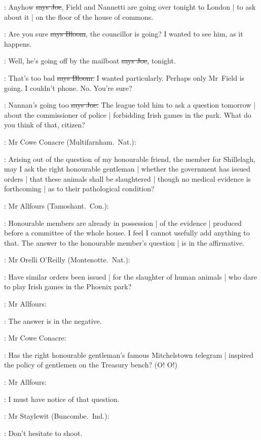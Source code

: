 \joe:
Anyhow
\sout{says Joe},
Field and Nannetti are going over tonight to London
 |
to ask about it |
on the floor of the house of commons.

\Bloom:
Are you sure
\sout{says Bloom},
the councillor is going?
I wanted to see him,
as it happens.

\joe:
Well,
he's going off by the mailboat
\sout{says Joe},
tonight.

\Bloom:
That's too bad
\sout{says Bloom.}
I wanted particularly.
Perhaps only Mr~Field is going.
I couldn't phone.
No.
You're sure?

\joe:
Nannan's going too
\sout{says Joe.}
The league told him to ask a question tomorrow |
about the commissioner of police |
forbidding Irish games in the park.
What do you think of that,
citizen?

:
Mr Cowe Conacre
(Multifarnham.~Nat.):

\conacre:
Arising out of the question of my honourable friend,
the member for Shillelagh,
may I ask the right honourable gentleman |
whether the government has issued orders |
that these animals shall be slaughtered |
though no medical evidence is forthcoming |
as to their pathological condition?

:
Mr Allfours
(Tamoshant.~Con.):

\allfours:
Honourable members are already in possession |
of the evidence |
produced before a committee of the whole house.
I feel I cannot usefully add anything to that.
The answer to the honourable member's question |
is in the affirmative.

:
Mr Orelli O'Reilly
(Montenotte.~Nat.):


\oreilly:
Have similar orders been issued |
for the slaughter of human animals
 |
who dare to play Irish games in the Phoenix park?

:
Mr Allfours:

\allfours:
The answer is in the negative.

:
Mr Cowe Conacre:

\conacre:
Has the right honourable gentleman's famous Mitchelstown telegram |
inspired the policy of gentlemen on the Treasury bench?
(O!
O!)

:
Mr Allfours:

\allfours:
I must have notice of that question.

:
Mr Staylewit
(Buncombe.~Ind.):

\staylewit:
Don't hesitate to shoot.

